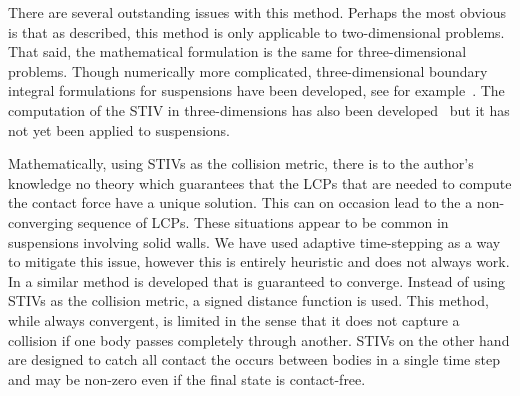\documentclass[preprint, 10pt]{elsarticle}
\begin{document}
There are several outstanding issues with this method. Perhaps the most
obvious is that as described, this method is only applicable to
two-dimensional problems. That said, the mathematical formulation is the
same for three-dimensional problems. Though numerically more
complicated, three-dimensional boundary integral formulations for
suspensions have been developed, see for example~\cite{Corona2017}.  The
computation of the STIV in three-dimensions has also been
developed~\cite{Harmon2011} but it has not yet been applied to
suspensions.

Mathematically, using STIVs as the collision metric, there is to the
author's knowledge no theory which guarantees that the LCPs that are
needed to compute the contact force have a unique solution. This can on
occasion lead to the a non-converging sequence of LCPs. These situations
appear to be common in suspensions involving solid walls. We have used
adaptive time-stepping as a way to mitigate this issue, however this is
entirely heuristic and does not always work. In \cite{Yan2017} a similar
method is developed that is guaranteed to converge. Instead of using
STIVs as the collision metric, a signed distance function is used. This
method, while always convergent, is limited in the sense that it does
not capture a collision if one body passes completely through another.
STIVs on the other hand are designed to catch all contact the occurs
between bodies in a single time step and may be non-zero even if the final state is contact-free. 



 

\end{document}
